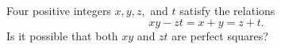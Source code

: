 Four positive integers $x,y,z,$ and $t$ satisfy the relations
\[
xy-zt=x+y=z+t.
\]
Is it possible that both $xy$ and $zt$ are perfect squares?
